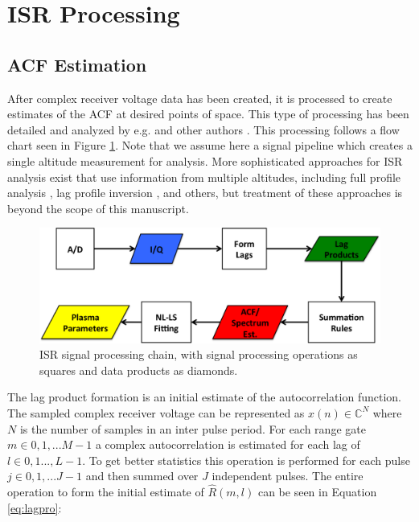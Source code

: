 \section{ISR Processing}

\subsection{ACF Estimation}
After complex receiver voltage data has been created, it is processed to create estimates of the ACF at desired points of space. This type of processing has been detailed and analyzed by e.g. \cite{farley1969} and other authors \cite{nygren1996}. This processing follows a flow chart seen in Figure \ref{fig:chain}.  Note that we assume here a signal pipeline which creates a single altitude measurement for analysis.  More sophisticated approaches for ISR analysis exist that use information from multiple altitudes, including full profile analysis \cite{RDS:RDS3308}, lag profile inversion \cite{Virtanen:20082vx}, and others, but treatment of these approaches is beyond the scope of this manuscript.

\begin{figure}[!t]
\centering
\includegraphics[width=6in]{datastackchain}
\caption{ISR signal processing chain, with signal processing operations as squares and data products as diamonds.}
\label{fig:chain}
\end{figure}


The lag product formation is an initial estimate of the autocorrelation function. The sampled complex receiver voltage can be represented as $x(n) \in\mathbb{C}^N$ where $N$ is the number of samples in an inter pulse period. For each range gate $m\in 0,1,...M-1$ a complex autocorrelation is estimated for each lag of $l \in 0,1...,L-1$.  To get better statistics this operation is performed for each pulse $j\in 0,1,...J-1$ and then summed over $J$ independent pulses. The entire operation to form the initial estimate of $\widehat{R}(m,l)$ can be seen in Equation \ref{eq:lagpro}:

